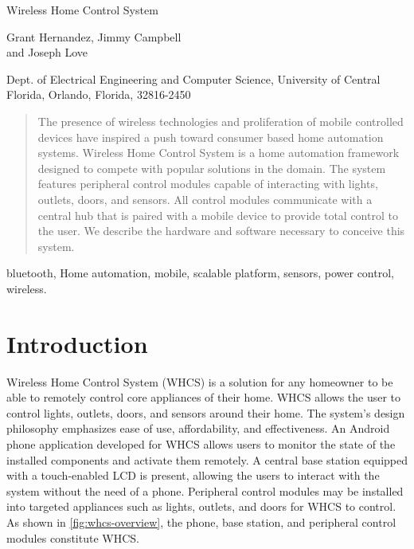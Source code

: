 \documentclass[draft,twocolumn,letterpaper,10pt]{IEEEtran}
\begin{document}

\setcounter{secnumdepth}{3}
\setcounter{tocdepth}{4}

\begin{center}
\huge Wireless Home Control System
\vspace{0.5cm}

\large Grant Hernandez, Jimmy Campbell\\ and Joseph Love
\vspace{0.5cm}

\large Dept. of Electrical Engineering and Computer Science, University of Central Florida, Orlando, Florida, 32816-2450  
\vspace{0.5cm}
\end{center}

\begin{abstract}
The presence of wireless technologies and proliferation of mobile controlled devices have inspired a push toward consumer based home automation systems. Wireless Home Control System is a home automation framework designed to compete with popular solutions in the domain. The system features peripheral control modules capable of interacting with lights, outlets, doors, and sensors. All control modules communicate with a central hub that is paired with a mobile device to provide total control to the user. We describe the hardware and software necessary to conceive this system.
\end{abstract}

\begin{IEEEkeywords}
bluetooth, Home automation, mobile, scalable platform, sensors, power control, wireless.
\end{IEEEkeywords}

\section{Introduction}
Wireless Home Control System (WHCS) is a solution for any homeowner to
be able to remotely control core appliances of their home. WHCS
allows the user to control lights, outlets, doors, and sensors around their
home. The system{}'s design philosophy emphasizes ease of use, affordability,
and effectiveness. An Android phone application developed for WHCS allows
users to monitor the state of the installed components and activate them
remotely. A central base station equipped with a touch{}-enabled LCD is
present, allowing the users to interact with the system without the need of a
phone. Peripheral control modules may be installed into targeted
appliances such as lights, outlets, and doors for WHCS to control. As shown in \autoref{fig:whcs-overview}, the
phone, base station, and peripheral control modules constitute WHCS.
\end{document}
